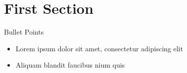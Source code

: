 \section{First Section}

\begin{frame}{Bullet Points}
    \begin{itemize}
        \item Lorem ipsum dolor sit amet, consectetur adipiscing elit
        \item Aliquam blandit faucibus nium quis
    \end{itemize}
\end{frame}